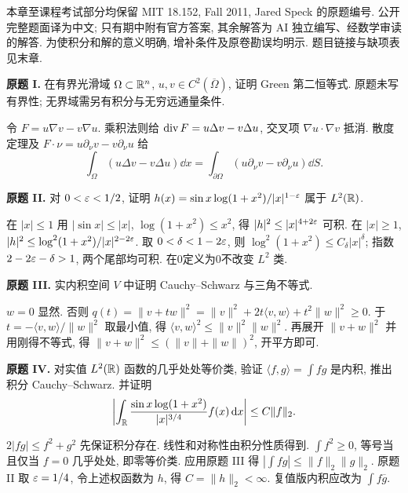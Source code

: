 \label{ch:assignheat}
本章至课程考试部分均保留 MIT 18.152, Fall 2011, Jared Speck 的原题编号. 公开完整题面译为中文; 只有期中附有官方答案, 其余解答为 AI 独立编写、经数学审读的解答. 为使积分和解的意义明确, 增补条件及原卷勘误均明示. 题目链接与缺项表见末章.
\begin{exercise}\label{ps:1I}
\textbf{原题 I.} 在有界光滑域 $\Omega\subset\mathbb R^n$, $u,v\in C^2(\overline\Omega)$, 证明 Green 第二恒等式. 原题未写有界性; 无界域需另有积分与无穷远通量条件.
\end{exercise}
\begin{solution}
令 $F=u\nabla v-v\nabla u$. 乘积法则给 $\operatorname{div} F=u\Delta v-v\Delta u$, 交叉项 $\nabla u\cdot\nabla v$ 抵消. 散度定理及 $F\cdot\nu=u\partial_\nu v-v\partial_\nu u$ 给
\[
\int_\Omega(u\Delta v-v\Delta u)\dd x
=\int_{\partial\Omega}(u\partial_\nu v-v\partial_\nu u)\dd S.
\]
\end{solution}
\begin{exercise}\label{ps:1II}
\textbf{原题 II.} 对 $0<\varepsilon<1/2$, 证明 $h(x)=\sin x\log(1+x^2)/|x|^{1-\varepsilon}$ 属于 $L^2(\mathbb R)$.
\end{exercise}
\begin{solution}
在 $|x|\le1$ 用 $|\sin x|\le|x|$, $\log(1+x^2)\le x^2$, 得 $|h|^2\le|x|^{4+2\varepsilon}$ 可积. 在 $|x|\ge1$, $|h|^2\le\log^2(1+x^2)/|x|^{2-2\varepsilon}$. 取 $0<\delta<1-2\varepsilon$, 则 $\log^2(1+x^2)\le C_\delta |x|^\delta$; 指数 $2-2\varepsilon-\delta>1$, 两个尾部均可积. 在0定义为0不改变 $L^2$ 类.
\end{solution}
\begin{exercise}\label{ps:1III}
\textbf{原题 III.} 实内积空间 $V$ 中证明 Cauchy--Schwarz 与三角不等式.
\end{exercise}
\begin{solution}
$w=0$ 显然. 否则 $q(t)=\|v+tw\|^2=\|v\|^2+2t\langle v,w\rangle+t^2\|w\|^2\ge0$. 于 $t=-\langle v,w\rangle/\|w\|^2$ 取最小值, 得 $\langle v,w\rangle^2\le\|v\|^2\|w\|^2$. 再展开 $\|v+w\|^2$ 并用刚得不等式, 得 $\|v+w\|^2\le(\|v\|+\|w\|)^2$, 开平方即可.
\end{solution}
\begin{exercise}\label{ps:1IV}
\textbf{原题 IV.} 对实值 $L^2(\mathbb R)$ 函数的几乎处处等价类, 验证 $\langle f,g\rangle=\int fg$ 是内积, 推出积分 Cauchy--Schwarz. 并证明
\[
\left|\int_\mathbb R\frac{\sin x\log(1+x^2)}{|x|^{3/4}}f(x)\,\mathrm d x\right|\le C\|f\|_2.
\]
\end{exercise}
\begin{solution}
$2|fg|\le f^2+g^2$ 先保证积分存在. 线性和对称性由积分性质得到. $\int f^2\ge0$, 等号当且仅当 $f=0$ 几乎处处, 即零等价类. 应用原题 III 得 $|\int fg|\le\|f\|_2\|g\|_2$. 原题 II 取 $\varepsilon=1/4$, 令上述权函数为 $h$, 得 $C=\|h\|_2<\infty$. 复值版内积应改为 $\int f\overline g$.
\end{solution}
